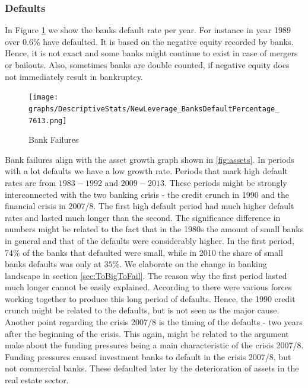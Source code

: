 \documentclass[12pt, a4paper]{article} %
\begin{document}

\subsubsection{Defaults}

In Figure \ref{fig:banks_default} we show the banks default rate per year. For instance in year 1989 over $0.6\%$ have defaulted. It is based on the negative equity recorded by banks. Hence, it is not exact and some banks might continue to exist in case of mergers or bailouts. Also, sometimes banks are double counted, if negative equity does not immediately result in bankruptcy.

\begin{figure}[H]
\centering
\caption{Bank Failures}
\texttt{[image: graphs/DescriptiveStats/NewLeverage\_BanksDefaultPercentage\_7613.png]}
\label{fig:banks_default}
\end{figure}


Bank failures align with the asset growth graph shown in \ref{fig:assets}. In periods with a lot defaults we have a low growth rate. Periods that mark high default rates are from $1983-1992$ and $2009-2013$. These periods might be strongly interconnected with the two banking crisis - the credit crunch in 1990 and the financial crisis in 2007/8. The first high default period had much higher default rates and lasted much longer than the second.
The significance difference in numbers might be related to the fact that in the 1980s the amount of small banks in general and that of the defaults were considerably higher.  In the first period, $74\%$ of the banks that defaulted were small, while in 2010 the share of small banks defaults was only at $35\%$. We elaborate on the change in banking landscape in section \ref{sec:ToBigToFail}. The reason why the first period lasted much longer cannot be easily explained. According to \citet{federal1997history} there were various forces working together to produce this long period of defaults. Hence, the 1990 credit crunch might be related to the defaults, but is not seen as the major cause.
Another point regarding the crisis 2007/8 is the timing of the defaults - two years after the beginning of the crisis. This again, might be related to the argument \cite{antoniades2019commercial} make about the funding pressures being a main characteristic of the crisis 2007/8. Funding pressures caused investment banks to default in the crisis 2007/8, but not commercial banks. These defaulted later by the deterioration of assets in the real estate sector.
\end{document}
